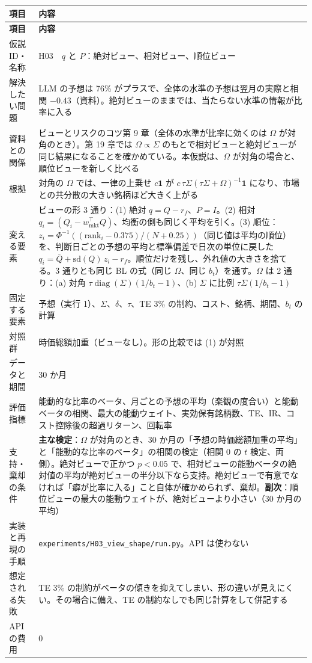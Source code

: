 \documentclass[xelatex,ja=standard,jafont=haranoaji,a4paper,10pt,openany]{bxjsreport}
\newcommand{\code}[1]{\texttt{#1}}
\newcommand{\T}{^{\top}}
\newcommand{\wmkt}{w_{\mathrm{mkt}}}
\newcommand{\one}{\mathbf{1}}
\DeclareMathOperator{\diag}{diag}
\newenvironment{plan}{\small\begin{longtable}{p{3.3cm}p{11.6cm}}\toprule\textbf{項目} & \textbf{内容} \\\midrule\endfirsthead
\toprule\textbf{項目} & \textbf{内容} \\\midrule\endhead\bottomrule\endfoot}{\end{longtable}}
\begin{document}
\begin{plan}
仮説 ID・名称 & H03　$q$ と $P$：絶対ビュー、相対ビュー、順位ビュー \\
解決したい問題 & LLM の予想は 76\% がプラスで、全体の水準の予想は翌月の実際と相関 $-0.43$（資料）。絶対ビューのままでは、当たらない水準の情報が比率に入る \\
資料との関係 & ビューとリスクのコツ第 9 章（全体の水準が比率に効くのは $\Omega$ が対角のとき）。第 19 章では $\Omega\propto\Sigma$ のもとで相対ビューと絶対ビューが同じ結果になることを確かめている。本仮説は、$\Omega$ が対角の場合と、順位ビューを新しく比べる \\
根拠 & 対角の $\Omega$ では、一律の上乗せ $c\one$ が $c\,\tau\Sigma(\tau\Sigma+\Omega)^{-1}\one$ になり、市場との共分散の大きい銘柄ほど大きく上がる \\
変える要素 & ビューの形 3 通り：(1) 絶対 $q=Q-r_f$、$P=I$。(2) 相対 $q_i=(Q_i-\wmkt\T Q)$、均衡の側も同じく平均を引く。(3) 順位：$z_i=\Phi^{-1}((\mathrm{rank}_i-0.375)/(N+0.25))$（同じ値は平均の順位）を、判断日ごとの予想の平均と標準偏差で日次の単位に戻した $q_i=\bar Q+\mathrm{sd}(Q)\,z_i-r_f$。順位だけを残し、外れ値の大きさを捨てる。3 通りとも同じ BL の式（同じ $\Omega$、同じ $b_t$）を通す。$\Omega$ は 2 通り：(a) 対角 $\tau\diag(\Sigma)(1/b_t-1)$、(b) $\Sigma$ に比例 $\tau\Sigma(1/b_t-1)$ \\
固定する要素 & 予想（実行 1）、$\Sigma$、$\delta$、$\tau$、TE 3\% の制約、コスト、銘柄、期間、$b_t$ の計算 \\
対照群 & 時価総額加重（ビューなし）。形の比較では (1) が対照 \\
データと期間 & 30 か月 \\
評価指標 & 能動的な比率のベータ、月ごとの予想の平均（楽観の度合い）と能動ベータの相関、最大の能動ウェイト、実効保有銘柄数、TE、IR、コスト控除後の超過リターン、回転率 \\
支持・棄却の条件 & \textbf{主な検定}：$\Omega$ が対角のとき、30 か月の「予想の時価総額加重の平均」と「能動的な比率のベータ」の相関の検定（相関 0 の $t$ 検定、両側）。絶対ビューで正かつ $p<0.05$ で、相対ビューの能動ベータの絶対値の平均が絶対ビューの半分以下なら支持。絶対ビューで有意でなければ「癖が比率に入る」こと自体が確かめられず、棄却。\textbf{副次}：順位ビューの最大の能動ウェイトが、絶対ビューより小さい（30 か月の平均） \\
実装と再現の手順 & \code{experiments/H03\_view\_shape/run.py}。API は使わない \\
想定される失敗 & TE 3\% の制約がベータの傾きを抑えてしまい、形の違いが見えにくい。その場合に備え、TE の制約なしでも同じ計算をして併記する \\
API の費用 & 0 \\
\end{plan}
\end{document}
